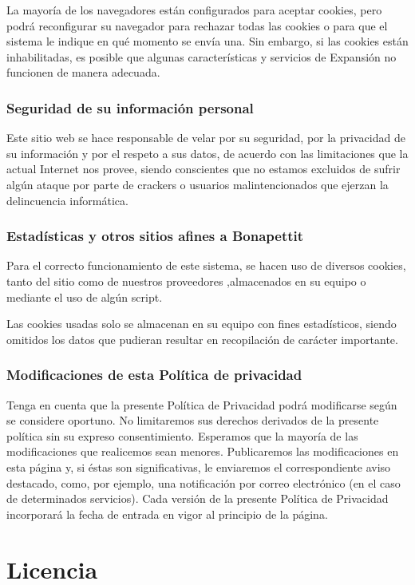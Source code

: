 La mayoría de los navegadores están configurados para aceptar cookies, pero podrá
reconfigurar su navegador para rechazar todas las cookies o para que el sistema le
indique en qué momento se envía una. Sin embargo, si las cookies están inhabilitadas, es posible que algunas características y servicios de Expansión no funcionen de manera adecuada.

\subsection{Seguridad de su información personal}
Este sitio web se hace responsable de velar por su seguridad, por la privacidad de su información y por el respeto a sus datos, de acuerdo con las limitaciones que la actual Internet nos provee, siendo conscientes que no estamos excluidos de sufrir algún ataque por parte de crackers o usuarios malintencionados que ejerzan la delincuencia informática.
\subsection{Estadísticas y otros sitios afines a Bonapettit}
Para el correcto funcionamiento de este sistema, se hacen uso de diversos cookies, tanto del sitio como de nuestros proveedores ,almacenados en su equipo o mediante el uso de algún script.

Las cookies usadas solo se almacenan en su equipo con fines estadísticos, siendo omitidos los datos que pudieran resultar en recopilación de carácter importante.

\subsection{Modificaciones de esta Política de privacidad}
Tenga en cuenta que la presente Política de Privacidad podrá modificarse según se
considere oportuno. No limitaremos sus derechos derivados de la presente política sin su expreso consentimiento. Esperamos que la mayoría de las modificaciones que
realicemos sean menores. Publicaremos las modificaciones en esta página y, si éstas son significativas, le enviaremos el correspondiente aviso destacado, como, por ejemplo, una notificación por correo electrónico (en el caso de determinados servicios). Cada versión de la presente Política de Privacidad incorporará la fecha de entrada en vigor al principio de la página.

\newpage
\chapter{Licencia}
